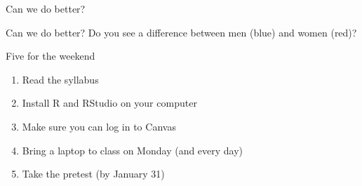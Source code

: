 \documentclass{beamer}\usepackage[]{graphicx}\usepackage[]{color}
\newenvironment{knitrout}{}{} %
\begin{document}
\begin{darkframes}
\begin{frame}{Can we do better?}
\begin{knitrout}


\end{knitrout}
    \end{frame}

    \begin{frame}{Can we do better?}
      Do you see a difference between men (blue) and women (red)?

\begin{knitrout}


\end{knitrout}
    \end{frame}

    \begin{frame}{Five for the weekend}
      \begin{enumerate}
        \item Read the syllabus
        \item Install R and RStudio on your computer
        \item Make sure you can log in to Canvas
        \item Bring a laptop to class on Monday (and every day)
        \item Take the pretest (by January 31)
      \end{enumerate}
    \end{frame}


  \end{darkframes}
\end{document}

